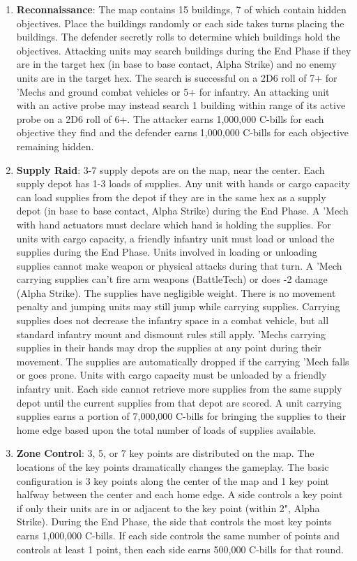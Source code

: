 \begin{enumerate}

\item {\bfseries Reconnaissance}: The map contains 15 buildings, 7 of which contain hidden objectives.
Place the buildings randomly or each side takes turns placing the buildings.
The defender secretly rolls to determine which buildings hold the objectives.
Attacking units may search buildings during the End Phase if they are in the target hex (in base to base contact, Alpha Strike) and no enemy units are in the target hex.
The search is successful on a 2D6 roll of 7+ for 'Mechs and ground combat vehicles or 5+ for infantry.
An attacking unit with an active probe may instead search 1 building within range of its active probe on a 2D6 roll of 6+.
The attacker earns 1,000,000 C-bills for each objective they find and the defender earns 1,000,000 C-bills for each objective remaining hidden.

\item {\bfseries Supply Raid}: 3-7 supply depots are on the map, near the center.
Each supply depot has 1-3 loads of supplies.
Any unit with hands or cargo capacity can load supplies from the depot if they are in the same hex as a supply depot (in base to base contact, Alpha Strike) during the End Phase.
A 'Mech with hand actuators must declare which hand is holding the supplies.
For units with cargo capacity, a friendly infantry unit must load or unload the supplies during the End Phase.
Units involved in loading or unloading supplies cannot make weapon or physical attacks during that turn.
A 'Mech carrying supplies can't fire arm weapons (BattleTech) or does -2 damage (Alpha Strike).
The supplies have negligible weight.
There is no movement penalty and jumping units may still jump while carrying supplies.
Carrying supplies does not decrease the infantry space in a combat vehicle, but all standard infantry mount and dismount rules still apply.
'Mechs carrying supplies in their hands may drop the supplies at any point during their movement.
The supplies are automatically dropped if the carrying 'Mech falls or goes prone.
Units with cargo capacity must be unloaded by a friendly infantry unit.
Each side cannot retrieve more supplies from the same supply depot until the current supplies from that depot are scored.
A unit carrying supplies earns a portion of 7,000,000 C-bills for bringing the supplies to their home edge based upon the total number of loads of supplies available.

\item {\bfseries Zone Control}: 3, 5, or 7 key points are distributed on the map.
The locations of the key points dramatically changes the gameplay.
The basic configuration is 3 key points along the center of the map and 1 key point halfway between the center and each home edge.
A side controls a key point if only their units are in or adjacent to the key point (within 2", Alpha Strike).
During the End Phase, the side that controls the most key points earns 1,000,000 C-bills.
If each side controls the same number of points and controls at least 1 point, then each side earns 500,000 C-bills for that round.


\end{enumerate}
